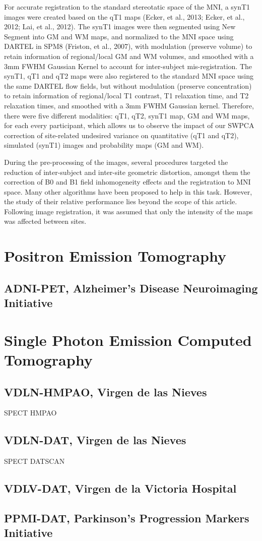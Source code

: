 For accurate registration to the standard stereotatic space of the
\ac{MNI}, a \ac{synT1} images were created based on the \ac{qT1}
maps (Ecker, et al., 2013; Ecker, et al., 2012; Lai, et al., 2012). The
\ac{synT1} images were then segmented using New Segment into \ac{GM} and
\ac{WM} maps, and normalized to the \ac{MNI} space using DARTEL in
SPM8 (Friston, et al., 2007), with modulation (preserve volume) to
retain information of regional/local \ac{GM} and \ac{WM} volumes, and smoothed
with a 3mm FWHM Gaussian Kernel to account for inter-subject
mis-registration. The \ac{synT1}, \ac{qT1} and \ac{qT2} maps were also registered to
the standard \ac{MNI} space using the same DARTEL flow fields, but without
modulation (preserve concentration) to retain information of
regional/local T1 contrast, T1 relaxation time, and T2 relaxation
times, and smoothed with a 3mm FWHM Gaussian kernel. Therefore, there
were five different modalities: \ac{qT1}, \ac{qT2}, \ac{synT1} map, \ac{GM} and \ac{WM} maps,
for each every participant, which allows us to observe the impact of our \ac{SWPCA} correction of site-related undesired variance on quantitative (\ac{qT1} and \ac{qT2}), simulated (\ac{synT1}) images and probability maps (\ac{GM} and \ac{WM}).
	
During the pre-processing of the images, several procedures targeted the reduction of inter-subject and inter-site geometric distortion, amongst them the correction of B0 and B1 field inhomogeneity effects and the registration to \ac{MNI} space. Many other algorithms have been proposed to help in this task. However, the study of their relative performance lies beyond the scope of this article. Following image registration, it was assumed that only the intensity of the maps was affected between sites.

\section{Positron Emission Tomography}
\subsection{ADNI-PET, Alzheimer's Disease Neuroimaging Initiative}
\section{Single Photon Emission Computed Tomography}

\subsection{VDLN-HMPAO, Virgen de las Nieves}
SPECT HMPAO 

\subsection{VDLN-DAT, Virgen de las Nieves}
SPECT DATSCAN

\subsection{VDLV-DAT, Virgen de la Victoria Hospital}

\subsection{PPMI-DAT, Parkinson's Progression Markers Initiative}